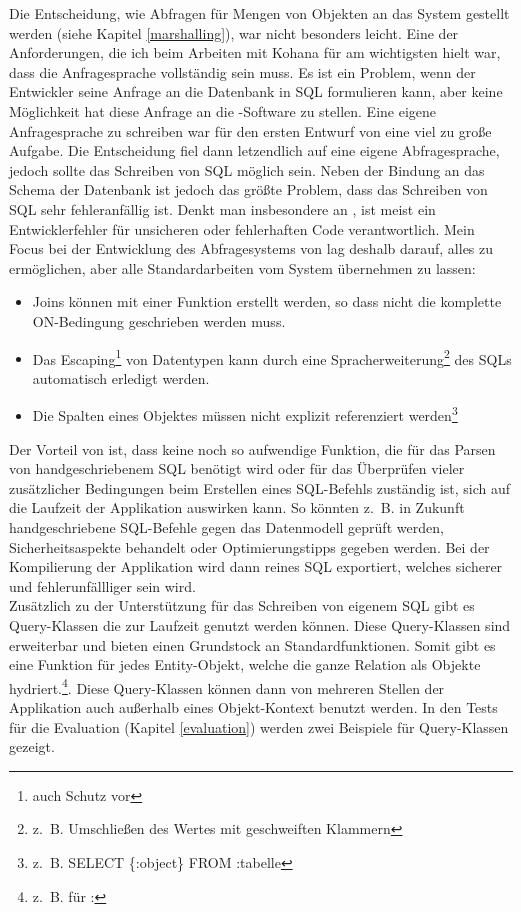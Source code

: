 Die Entscheidung, wie Abfragen für Mengen von Objekten an das System gestellt werden (siehe Kapitel \ref{marshalling}), war nicht besonders leicht. Eine der Anforderungen, die ich beim Arbeiten mit Kohana für am wichtigsten hielt war, dass die Anfragesprache vollständig sein muss. Es ist ein Problem, wenn der Entwickler seine Anfrage an die Datenbank in SQL formulieren kann, aber keine Möglichkeit hat diese Anfrage an die \ORM-Software zu stellen. Eine eigene Anfragesprache zu schreiben war für den ersten Entwurf von \PSCORM eine viel zu große Aufgabe. Die Entscheidung fiel dann letzendlich auf eine eigene Abfragesprache, jedoch sollte das Schreiben von SQL möglich sein. Neben der Bindung an das Schema der Datenbank ist jedoch das größte Problem, dass das Schreiben von SQL sehr fehleranfällig ist. Denkt man insbesondere an , ist meist ein Entwicklerfehler für unsicheren oder fehlerhaften Code verantwortlich. Mein Focus bei der Entwicklung des Abfragesystems von \PSCORM lag deshalb darauf, alles zu ermöglichen, aber alle Standardarbeiten vom System übernehmen zu lassen:
\begin{itemize}
\item Joins können mit einer Funktion erstellt werden, so dass nicht die komplette ON-Bedingung geschrieben werden muss.
\item Das Escaping\footnote{auch Schutz vor } von Datentypen kann durch eine Spracherweiterung\footnote{z.~B. Umschließen des Wertes mit geschweiften Klammern} des SQLs automatisch erledigt werden.
\item Die Spalten eines Objektes müssen nicht explizit referenziert werden\footnote{z.~B. SELECT \{:object\} FROM :tabelle}
\end{itemize}
Der Vorteil von \PSCORM ist, dass keine noch so aufwendige Funktion, die für das Parsen von handgeschriebenem SQL benötigt wird oder für das Überprüfen vieler zusätzlicher Bedingungen beim Erstellen eines SQL-Befehls zuständig ist, sich auf die Laufzeit der Applikation auswirken kann. So könnten z.~B. in Zukunft handgeschriebene SQL-Befehle gegen das Datenmodell geprüft werden, Sicherheitsaspekte behandelt oder Optimierungstipps gegeben werden. Bei der Kompilierung der Applikation wird dann reines SQL exportiert, welches sicherer und fehlerunfällliger sein wird. \\
Zusätzlich zu der Unterstützung für das Schreiben von eigenem SQL gibt es Query-Klassen die zur Laufzeit genutzt werden können. Diese Query-Klassen sind erweiterbar und bieten einen Grundstock an Standardfunktionen. Somit gibt es eine Funktion für jedes Entity-Objekt, welche die ganze Relation als Objekte hydriert.\footnote{z.~B. für : }. Diese Query-Klassen können dann von mehreren Stellen der Applikation auch außerhalb eines Objekt-Kontext benutzt werden. In den Tests für die Evaluation (Kapitel \ref{evaluation}) werden zwei Beispiele für Query-Klassen gezeigt.\\

